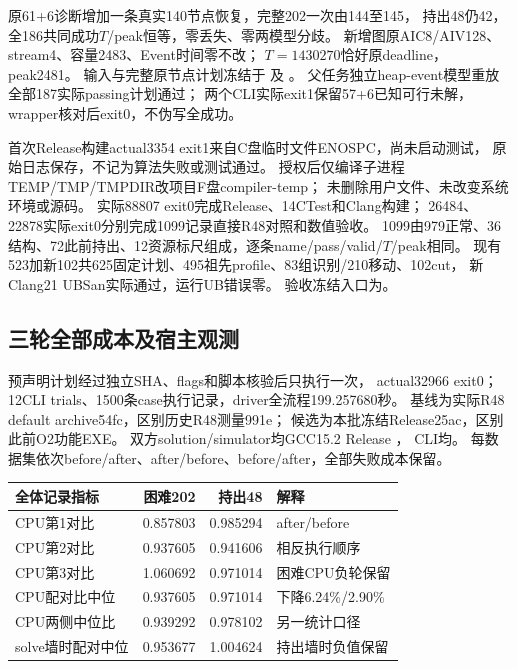 \documentclass[UTF8,fontset=fandol,11pt]{ctexart}
\begin{document}
原61+6诊断增加一条真实140节点恢复，完整202一次由144至145，
持出48仍42，全186共同成功$T$/peak恒等，零丢失、零两模型分歧。
新增图原AIC8/AIV128、stream4、容量2483、Event时间零不改；
$T=1430270$恰好原deadline，peak2481。
输入与完整原节点计划冻结于
及
。
父任务独立heap-event模型重放全部187实际passing计划通过；
两个CLI实际exit1保留57+6已知可行未解，wrapper核对后exit0，不伪写全成功。

首次Release构建actual3354 exit1来自C盘临时文件ENOSPC，尚未启动测试，
原始日志保存，不记为算法失败或测试通过。
授权后仅编译子进程TEMP/TMP/TMPDIR改项目F盘compiler-temp；
未删除用户文件、未改变系统环境或源码。
实际88807 exit0完成Release、14CTest和Clang构建；
26484、22878实际exit0分别完成1099记录直接R48对照和数值验收。
1099由979正常、36结构、72此前持出、12资源标尺组成，逐条name/pass/valid/$T$/peak相同。
现有523加新102共625固定计划、495祖先profile、83组识别/210移动、102cut，
新Clang21 UBSan实际通过，运行UB错误零。
验收冻结入口为。

\subsection{三轮全部成本及宿主观测}
预声明计划经过独立SHA、flags和脚本核验后只执行一次，
actual32966 exit0；12CLI trials、1500条case执行记录，driver全流程199.257680秒。
基线为实际R48 default archive54fc，区别历史R48测量991e；
候选为本批冻结Release25ac，区别此前O2功能EXE。
双方solution/simulator均GCC15.2 Release
，
CLI均。
每数据集依次before/after、after/before、before/after，全部失败成本保留。

\begin{tabularx}{\textwidth}{L{3.4cm}rrX}
\toprule
全体记录指标 & 困难202 & 持出48 & 解释\\
\midrule
CPU第1对比 &0.857803&0.985294&after/before\\
CPU第2对比 &0.937605&0.941606&相反执行顺序\\
CPU第3对比 &1.060692&0.971014&困难CPU负轮保留\\
CPU配对比中位 &0.937605&0.971014&下降6.24\%/2.90\%\\
CPU两侧中位比 &0.939292&0.978102&另一统计口径\\
solve墙时配对中位 &0.953677&1.004624&持出墙时负值保留\\
\bottomrule
\end{tabularx}
\end{document}
